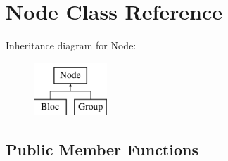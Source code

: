 \hypertarget{class_open_chams_1_1_node}{\section{Node Class Reference}
\label{class_open_chams_1_1_node}
}
Inheritance diagram for Node\-:\begin{figure}[H]
\begin{center}
\leavevmode
\includegraphics[height=2.000000cm]{class_open_chams_1_1_node}
\end{center}
\end{figure}
\subsection*{Public Member Functions}
